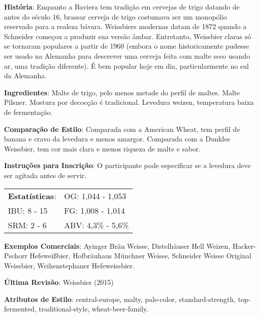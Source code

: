 \textbf{História}: Enquanto a Baviera tem tradição em cervejas de trigo datando de antes do século 16, brassar cerveja de trigo costumava ser um monopólio reservado para a realeza bávara. Weissbiers modernas datam de 1872 quando a Schneider começou a produzir sua versão âmbar. Entretanto, Weissbier claras só se tornaram populares a partir de 1960 (embora o nome historicamente pudesse ser usado na Alemanha para descrever uma cerveja feita com malte seco usando ar, uma tradição diferente). É bem popular hoje em dia, particularmente no sul da Alemanha.

\textbf{Ingredientes}: Malte de trigo, pelo menos metade do perfil de maltes. Malte Pilsner. Mostura por decocção é tradicional. Levedura weizen, temperatura baixa de fermentação.

\textbf{Comparação de Estilo}: Comparada com a American Wheat, tem perfil de banana e cravo da levedura e menos amargor. Comparada com a Dunkles Weissbier, tem cor mais clara e menos riqueza de malte e sabor.

\textbf{Instruções para Inscrição}: O participante pode especificar se a levedura deve ser agitada antes de servir.

\begin{tabular}{@{}p{35mm}p{35mm}@{}}
  \textbf{Estatísticas}: & OG: 1,044 - 1,053 \\
  IBU: 8 - 15 & FG: 1,008 - 1,014 \\
  SRM: 2 - 6 & ABV: 4,3\% - 5,6\%
\end{tabular}

\textbf{Exemplos Comerciais}: Ayinger Bräu Weisse, Distelhäuser Hell Weizen, Hacker-Pschorr Hefeweißbier, Hofbräuhaus Münchner Weisse, Schneider Weisse Original Weissbier, Weihenstephaner Hefeweissbier.

\textbf{Última Revisão}: Weissbier (2015)

\textbf{Atributos de Estilo}: central-europe, malty, pale-color, standard-strength, top-fermented, traditional-style, wheat-beer-family.
